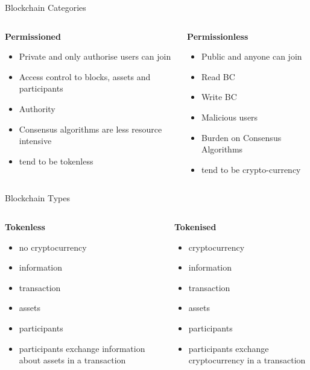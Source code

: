 \documentclass[pdf,table]{beamer}
\begin{document}
\begin{frame}{Blockchain Categories \cite{yaga2018blockchain}}
	\begin{columns}[T]
		\begin{column}{0.48\textwidth}
		\textbf{Permissioned}
			\begin{itemize}
				\item Private and only authorise users can join
				\item Access control to blocks, assets and participants
				\item Authority
				\item Consensus algorithms are less resource intensive
				\item tend to be tokenless 
			\end{itemize}
		\end{column}
		\begin{column}{0.48\textwidth}
			\textbf{Permissionless}
			\begin{itemize}
				\item Public and anyone can join
				\item Read BC
				\item Write BC
				\item Malicious users
				\item Burden on Consensus Algorithms 
				\item tend to be crypto-currency
			\end{itemize}
		\end{column}
	\end{columns}	
\end{frame}


\begin{frame}{Blockchain Types \cite{yaga2018blockchain}}
\begin{columns}[T]
	\begin{column}{0.48\textwidth}
	\textbf{Tokenless}
		\begin{itemize}
			\item no cryptocurrency
			\item information
			\item transaction
			\item assets
			\item participants
			\item participants exchange information about assets in a transaction
		\end{itemize}
	\end{column}
	\begin{column}{0.48\textwidth}
	\textbf{Tokenised}
		\begin{itemize}
			\item cryptocurrency
			\item information
			\item transaction
			\item assets
			\item participants
			\item participants exchange cryptocurrency in a transaction
		\end{itemize}
	\end{column}
\end{columns}	
\end{frame}
\end{document}

